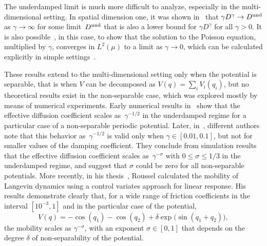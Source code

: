\documentclass[11pt,a4paper]{article}
\theoremstyle{plain}
\numberwithin{equation}{section}
\renewcommand{\leq}{\leqslant}
\begin{document}
The underdamped limit is much more difficult to analyze,
especially in the multi-dimensional setting.
In spatial dimension one, it was shown in~\cite{MR2394704} that $\gamma D^{\gamma} \to D^{\rm und}$ as $\gamma \to \infty$ for some limit~$D^{\rm und}$
that is also a lower bound for $\gamma D^{\gamma}$ for all $\gamma > 0$.
It is also possible~\cite[Lemma 3.4]{MR2394704}, in this case,
to show that the solution to the Poisson equation,
multiplied by $\gamma$, converges in $L^2(\mu)$ to a limit as $\gamma \to 0$,
which can be calculated explicitly in simple settings~\cite{MR2427108}.

These results extend to the multi-dimensional setting only when the potential is separable,
that is when $V$ can be decomposed as $V(q) = \sum_i V_i(q_i)$,
but no theoretical results exist in the non-separable case,
which was explored mostly by means of numerical experiments.
Early numerical results in~\cite{chen1996surface} show that the effective diffusion coefficient scales as~$\gamma^{-1/2}$ in the underdamped regime for a particular case of a non-separable periodic potential.
Later, in~\cite{Braun02},
different authors note that this behavior as~$\gamma^{-1/2}$ is valid only when $\gamma \in [0.01, 0.1]$,
but not for smaller values of the damping coefficient.
They conclude from simulation results that the effective diffusion coefficient scales as~$\gamma^{-\sigma}$ with $0 \leq \sigma \leq 1/3$ in the underdamped regime,
and suggest that $\sigma$ could be zero for all non-separable potentials.
More recently, in his thesis~\cite{roussel_thesis},
Roussel calculated the mobility of Langevin dynamics  using a control variates approach for linear response.
His results demonstrate clearly that, for a wide range of friction coefficients in the interval $[10^{-3}, 1]$ and in the particular case of the potential,
\[
    V(q) = - \cos(q_1) - \cos(q_2) + \delta \exp \bigl(\sin(q_1 + q_2)\bigr),
\]
the mobility scales as $\gamma^{- \sigma}$,
with an exponent $\sigma \in [0, 1]$ that depends on the degree $\delta$ of non-separability of the potential.
\end{document}
